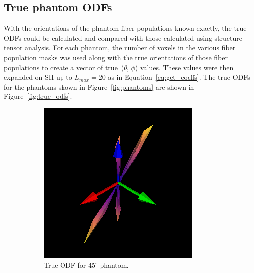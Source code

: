 \documentclass[11pt]{article}
\begin{document}
\subsection{True phantom ODFs}

With the orientations of the phantom fiber populations known exactly, the true
ODFs could be calculated and compared with those calculated using structure
tensor analysis. For each phantom, the number of voxels in the various fiber
population masks was used along with the true orientations of those fiber
populations to create a vector of true~($\theta$, $\phi$) values. These values
were then expanded on SH up to $L_{max}=20$ as in Equation~\ref{eq:get_coeffs}.
The true ODFs for the phantoms shown in Figure~\ref{fig:phantoms} are shown in
Figure~\ref{fig:true_odfs}. 

\begin{figure}[h]
  \centering
  \begin{subfigure}[t]{0.35\textwidth}
    \centering
    \includegraphics[width=0.9\linewidth]{figs/deg45_ODF}
    \caption{True ODF for 45$^{\circ}$ phantom.}
    \label{fig:deg45odf}
  \end{subfigure}
  \hspace{1em}
  \begin{subfigure}[t]{0.35\textwidth}
    \centering

\end{subfigure}
\end{figure}
\end{document}
